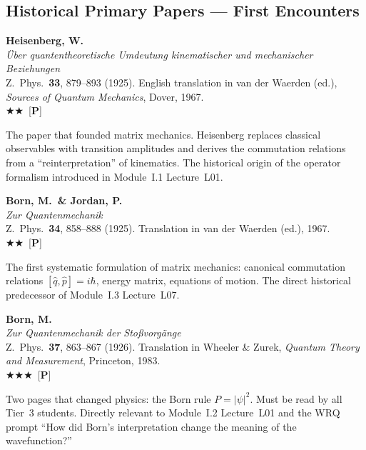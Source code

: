 \documentclass[11pt,a4paper]{article}
\newcommand{\essential}{$\bigstar\bigstar\bigstar$}
\newcommand{\recommended}{$\bigstar\bigstar$}
\newenvironment{bibentry}[1]{\begin{tcolorbox}[entrybox=#1,top=4pt,bottom=4pt]}{\end{tcolorbox}\smallskip}
\begin{document}
\subsection{Historical Primary Papers --- First Encounters}

\begin{bibentry}{t3light}
\textbf{Heisenberg, W.}\\
\textit{\"Uber quantentheoretische Umdeutung kinematischer und mechanischer
Beziehungen}\\
Z.~Phys.~\textbf{33}, 879--893 (1925). English translation in van der Waerden (ed.),
\textit{Sources of Quantum Mechanics}, Dover, 1967.\\[3pt]
\recommended\ [\textbf{P}]\\[3pt]
\begin{tcolorbox}[annotbox]
The paper that founded matrix mechanics. Heisenberg replaces classical observables with
transition amplitudes and derives the commutation relations from a ``reinterpretation''
of kinematics. The historical origin of the operator formalism introduced in
Module~I.1 Lecture~L01.
\end{tcolorbox}
\end{bibentry}

\begin{bibentry}{t3light}
\textbf{Born, M.\ \& Jordan, P.}\\
\textit{Zur Quantenmechanik}\\
Z.~Phys.~\textbf{34}, 858--888 (1925). Translation in van der Waerden (ed.), 1967.\\[3pt]
\recommended\ [\textbf{P}]\\[3pt]
\begin{tcolorbox}[annotbox]
The first systematic formulation of matrix mechanics: canonical commutation relations
$[\hat{q},\hat{p}]=i\hbar$, energy matrix, equations of motion. The direct historical
predecessor of Module~I.3 Lecture~L07.
\end{tcolorbox}
\end{bibentry}

\begin{bibentry}{t3light}
\textbf{Born, M.}\\
\textit{Zur Quantenmechanik der Sto\ss vorg\"ange}\\
Z.~Phys.~\textbf{37}, 863--867 (1926). Translation in Wheeler \& Zurek,
\textit{Quantum Theory and Measurement}, Princeton, 1983.\\[3pt]
\essential\ [\textbf{P}]\\[3pt]
\begin{tcolorbox}[annotbox]
Two pages that changed physics: the Born rule $P=|\psi|^2$.
Must be read by all Tier~3 students. Directly relevant to Module~I.2 Lecture~L01
and the WRQ prompt ``How did Born's interpretation change the meaning of the wavefunction?''
\end{tcolorbox}
\end{bibentry}
\end{document}
